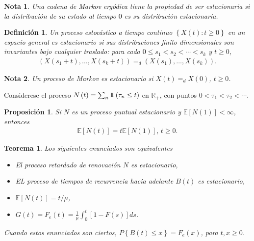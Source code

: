 \documentclass{article}
\newtheorem{Def}{Definición}[section]
\newtheorem{Teo}{Teorema}[section]
\newtheorem{Note}{Nota}[section]
\newtheorem{Prop}{Proposición}[section]
\newcommand{\rea}{\mathbb{R}}
\newcommand{\esp}{\mathbb{E}}
\newcommand{\indora}{\mbox{$1$\hspace{-0.8ex}$1$}}
\numberwithin{equation}{section}
\begin{document}
\begin{Note}
Una cadena de Markov erg\'odica tiene la propiedad de ser estacionaria si la distribuci\'on de su estado al tiempo $0$ es su distribuci\'on estacionaria.
\end{Note}

\begin{Def}
Un proceso estoc\'astico a tiempo continuo $\left\{X\left(t\right):t\geq0\right\}$ en un espacio general es estacionario si sus distribuciones finito dimensionales son invariantes bajo cualquier  traslado: para cada $0\leq s_{1}<s_{2}<\cdots<s_{k}$ y $t\geq0$,
\begin{eqnarray*}
\left(X\left(s_{1}+t\right),\ldots,X\left(s_{k}+t\right)\right)=_{d}\left(X\left(s_{1}\right),\ldots,X\left(s_{k}\right)\right).
\end{eqnarray*}
\end{Def}

\begin{Note}
Un proceso de Markov es estacionario si $X\left(t\right)=_{d}X\left(0\right)$, $t\geq0$.
\end{Note}

Considerese el proceso $N\left(t\right)=\sum_{n}\indora\left(\tau_{n}\leq t\right)$ en $\rea_{+}$, con puntos $0<\tau_{1}<\tau_{2}<\cdots$.

\begin{Prop}
Si $N$ es un proceso puntual estacionario y $\esp\left[N\left(1\right)\right]<\infty$, entonces 
\begin{eqnarray}
\esp\left[N\left(t\right)\right]=t\esp\left[N\left(1\right)\right]\textrm{, }t\geq0.
\end{eqnarray}
\end{Prop}

\begin{Teo}
Los siguientes enunciados son equivalentes
\begin{itemize}
\item[i)] El proceso retardado de renovaci\'on $N$ es estacionario,
\item[ii)] EL proceso de tiempos de recurrencia hacia adelante $B\left(t\right)$ es estacionario,
\item[iii)] $\esp\left[N\left(t\right)\right]=t/\mu$,
\item[iv)] $G\left(t\right)=F_{e}\left(t\right)=\frac{1}{\mu}\int_{0}^{t}\left[1-F\left(s\right)\right]ds$.
\end{itemize}
Cuando estos enunciados son ciertos, $P\left\{B\left(t\right)\leq x\right\}=F_{e}\left(x\right)$, para $t,x\geq0$.
\end{Teo}
\end{document}
